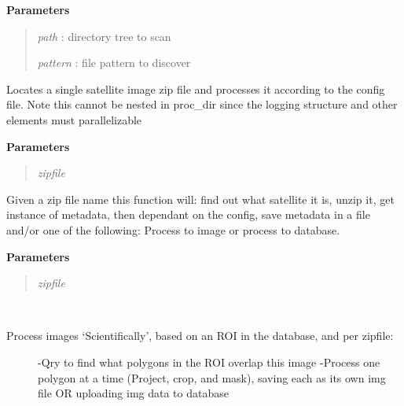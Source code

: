 \documentclass[letterpaper,10pt,openany,oneside]{sphinxmanual}
\begin{document}
\begin{fulllineitems}
\begin{fulllineitems}
\textbf{Parameters}
\begin{quote}

\emph{path}    : directory tree to scan

\emph{pattern} : file pattern to discover
\end{quote}

\end{fulllineitems}


\begin{fulllineitems}
\label{code:SigLib.SigLib.proc_File}
Locates a single satellite image zip file and processes it according 
to the config file.  Note this cannot be nested in proc\_dir since the 
logging structure and other elements must parallelizable

\textbf{Parameters}
\begin{quote}

\emph{zipfile}
\end{quote}

\end{fulllineitems}


\begin{fulllineitems}
\label{code:SigLib.SigLib.retrieve}
Given a zip file name this function will: find out what satellite it is, unzip it, get instance of metadata, then 
dependant on the config, save metadata in a file and/or one of the following: Process to image or process to database.

\textbf{Parameters}
\begin{quote}

\emph{zipfile}
\end{quote}

\end{fulllineitems}


\begin{fulllineitems}
\label{code:SigLib.SigLib.scientific}~\begin{description}
\item[{Process images `Scientifically', based on an ROI in the database, and per zipfile:}] \leavevmode
-Qry to find what polygons in the ROI overlap this image
-Process one polygon at a time (Project, crop, and mask), saving each as its own img file OR uploading img data to database


\end{description}
\end{fulllineitems}
\end{fulllineitems}
\end{document}
